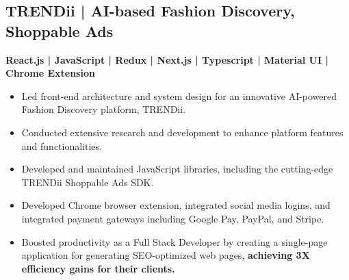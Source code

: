 \documentclass[letterpaper]{deedy-resume} %
\begin{document}
\begin{minipage}[t]{0.66\textwidth}
\sectionspace %

\subsection{TRENDii\href{https://www.trendii.com/}{\texorpdfstring{\faExternalLink}{}} | AI-based Fashion Discovery, Shoppable Ads}


\textbf{React.js | JavaScript | Redux | Next.js | Typescript | Material UI | Chrome Extension} \\
\begin{itemize}
    \setlength\itemsep{-0.5em} %
    \item Led front-end architecture and system design for an innovative AI-powered Fashion Discovery platform, TRENDii.
    \item Conducted extensive research and development to enhance platform features and functionalities.
    \item Developed and maintained JavaScript libraries, including the cutting-edge TRENDii Shoppable Ads SDK.
    \item Developed Chrome browser extension, integrated social media logins, and integrated payment gateways including Google Pay, PayPal, and Stripe.
    \item Boosted productivity as a Full Stack Developer by creating a single-page application for generating SEO-optimized web pages, \textbf{achieving 3X efficiency gains for their clients.}
\end{itemize}

\sectionspace %





\end{minipage} %


\newpage %
\end{document}
